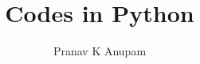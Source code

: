 \documentclass{article}
\title{Codes in Python}
\author{Pranav K Anupam}
\begin{document}
\maketitle
\inputminted[linenos]{python}{loop.py}
\inputminted[linenos]{c}{fac.c}
\inputminted[linenos]{tex}{cs201a1.tex}
\end{document}
